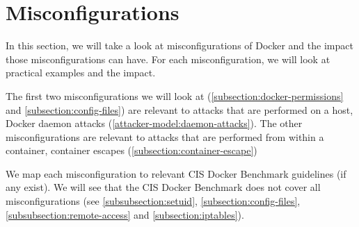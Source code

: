\section{Misconfigurations}\label{section:misconfigurations}
In this section, we will take a look at misconfigurations of Docker and the impact those misconfigurations can have. For each misconfiguration, we will look at practical examples and the impact.

The first two misconfigurations we will look at (\autoref{subsection:docker-permissions} and \autoref{subsection:config-files}) are relevant to attacks that are performed on a host, Docker daemon attacks (\autoref{attacker-model:daemon-attacks}). The other misconfigurations are relevant to attacks that are performed from within a container, container escapes (\autoref{subsection:container-escape})

\medskip

We map each misconfiguration to relevant CIS Docker Benchmark guidelines (if any exist). We will see that the CIS Docker Benchmark does not cover all misconfigurations (see \autoref{subsubsection:setuid}, \autoref{subsection:config-files}, \autoref{subsubsection:remote-access} and \autoref{subsection:iptables}).








